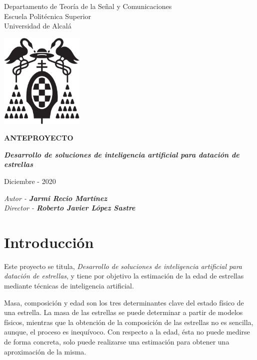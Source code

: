 \documentclass[12pt,oneside,a4paper]{article}
\begin{document}
\thispagestyle{empty}

\begin{center}


Departamento de Teoría de la Señal y Comunicaciones\\
Escuela Politécnica Superior\\
Universidad de Alcalá\\

\vspace{1cm}

\includegraphics[width=4cm]{figuras/logo-uah.eps}

\textbf{ANTEPROYECTO}

\vspace{1cm}

\begin{large}\textbf{\textit{Desarrollo de soluciones de inteligencia artificial para datación de estrellas}}\end{large}

\vfill

Diciembre - 2020

\end{center}

\begin{flushright}
\textit{Autor - \textbf{Jarmi Recio Martínez}} \\
\textit{Director - \textbf{Roberto Javier López Sastre}}
\end{flushright}

\newpage

\section{Introducción}
Este proyecto se titula, \textit{Desarrollo de soluciones de inteligencia artificial para datación de estrellas}, y tiene por objetivo la estimación de la edad de estrellas mediante técnicas de inteligencia artificial.

Masa, composición y edad son los tres determinantes clave del estado físico de una estrella.
La masa de las estrellas se puede determinar a partir de modelos físicos, mientras que la obtención de la composición de las estrellas no es sencilla, aunque, el proceso es inequívoco.
Con respecto a la edad, ésta no puede medirse de forma concreta, solo puede realizarse una estimación para obtener una aproximación de la misma.
\end{document}
